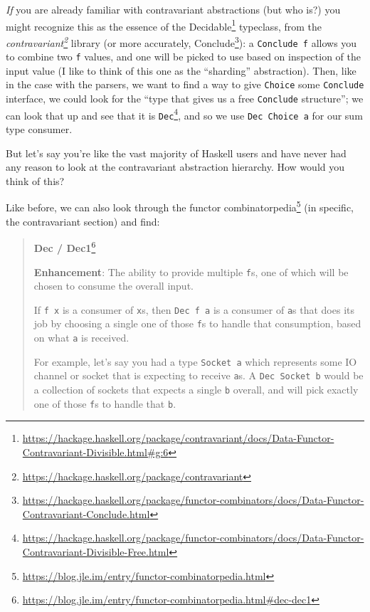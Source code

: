 \documentclass[]{article}
\renewcommand{\href}[2]{#2\footnote{\url{#1}}}
\begin{document}
\emph{If} you are already familiar with contravariant abstractions (but who is?)
you might recognize this as the essence of the
\href{https://hackage.haskell.org/package/contravariant/docs/Data-Functor-Contravariant-Divisible.html\#g:6}{Decidable}
typeclass, from the
\emph{\href{https://hackage.haskell.org/package/contravariant}{contravariant}}
library (or more accurately,
\href{https://hackage.haskell.org/package/functor-combinators/docs/Data-Functor-Contravariant-Conclude.html}{Conclude}):
a \texttt{Conclude\ f} allows you to combine two \texttt{f} values, and one will
be picked to use based on inspection of the input value (I like to think of this
one as the ``sharding'' abstraction). Then, like in the case with the parsers,
we want to find a way to give \texttt{Choice} some \texttt{Conclude} interface,
we could look for the ``type that gives us a free \texttt{Conclude} structure'';
we can look that up and see that it is
\href{https://hackage.haskell.org/package/functor-combinators/docs/Data-Functor-Contravariant-Divisible-Free.html}{\texttt{Dec}},
and so we use \texttt{Dec\ Choice\ a} for our sum type consumer.

But let's say you're like the vast majority of Haskell users and have never had
any reason to look at the contravariant abstraction hierarchy. How would you
think of this?

Like before, we can also look through the
\href{https://blog.jle.im/entry/functor-combinatorpedia.html}{functor
combinatorpedia} (in specific, the contravariant section) and find:

\begin{quote}
\href{https://blog.jle.im/entry/functor-combinatorpedia.html\#dec-dec1}{\textbf{Dec
/ Dec1}}

\textbf{Enhancement}: The ability to provide multiple \texttt{f}s, one of which
will be chosen to consume the overall input.

If \texttt{f\ x} is a consumer of \texttt{x}s, then \texttt{Dec\ f\ a} is a
consumer of \texttt{a}s that does its job by choosing a single one of those
\texttt{f}s to handle that consumption, based on what \texttt{a} is received.

For example, let's say you had a type \texttt{Socket\ a} which represents some
IO channel or socket that is expecting to receive \texttt{a}s. A
\texttt{Dec\ Socket\ b} would be a collection of sockets that expects a single
\texttt{b} overall, and will pick exactly one of those \texttt{f}s to handle
that \texttt{b}.
\end{quote}
\end{document}
